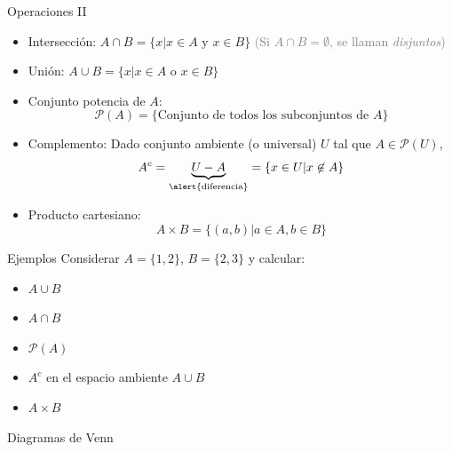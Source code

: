 \documentclass[14pt,aspectratio=169,xcolor=dvipsnames]{beamer}
\begin{document}
\begin{frame}{Operaciones II}
    \begin{small}
    \begin{itemize}
        \item Intersección:  $ A \cap B = \{ x | x\in A \text{ y } x\in B\} $ \hfill \textcolor{gray}{(Si $A\cap B = \emptyset$, se llaman \emph{disjuntos})}
        \item Unión: $ A \cup B = \{ x | x\in A \text{ o } x\in B\} $
        \item Conjunto potencia de $A$: 
            $$ \mathcal P(A) = \{ \text{Conjunto de todos los subconjuntos de $A$} \} $$
        \item Complemento: Dado conjunto ambiente (o universal) $U$ tal que $A\in \mathcal P(U)$, 
            $$ A^c = \underbrace{U - A}_\text{\alert{diferencia}} = \{x\in U | x \not\in A \} $$
        \item Producto cartesiano: 
            $$ A\times B = \{(a,b) | a \in A, b \in B \} $$
    \end{itemize}
    \end{small}
\end{frame}
\begin{frame}{Ejemplos}
    Considerar $A=\{1,2\}$, $B = \{2,3\}$ y calcular:
    \begin{itemize}
        \item $A\cup B$ 
        \item $A \cap B$  
        \item $\mathcal P(A)$ 
        \item $A^c$ en el espacio ambiente $A\cup B$ 
        \item $A\times B$ 
    \end{itemize}
\end{frame}
\begin{frame}{Diagramas de Venn}
\end{frame}
\end{document}
